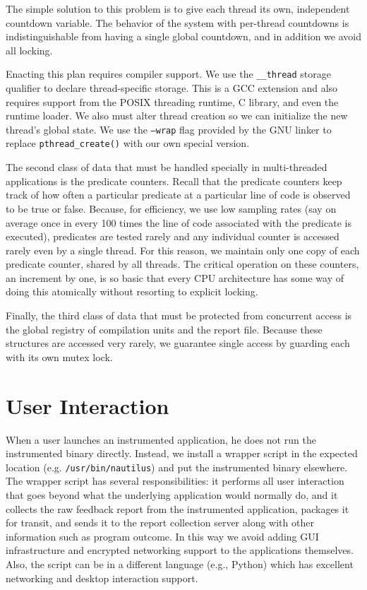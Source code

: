 \documentclass[times,10pt,twocolumn]{article}
\begin{document}
The simple solution to this problem is to give each thread its own,
independent countdown variable.  The behavior of the system with per-thread
countdowns is indistinguishable from having a single global countdown,
and in addition we avoid all locking.

Enacting this plan requires compiler support.  We use the
\texttt{\_\_thread} storage qualifier to declare thread-specific
storage.  This is a GCC extension and also requires support from the
POSIX threading runtime, C library, and even the runtime loader.  
We also must alter thread creation so we can initialize the
new thread's global state.  We use the \texttt{--wrap} flag provided
by the GNU linker to replace \texttt{pthread\_create()} with our own
special version.  

The second class of data that must be handled specially in
multi-threaded applications is the predicate counters.  Recall that
the predicate counters keep track of how often a particular predicate
at a particular line of code is observed to be true or false.
Because, for efficiency, we use low sampling rates (say on average
once in every 100 times the line of code associated with the predicate
is executed), predicates are tested rarely and any individual counter
is accessed rarely even by a single thread.  For this reason, we
maintain only one copy of each predicate counter, shared by all
threads.  The critical operation on these counters, an increment by
one, is so basic that every CPU architecture has some way of doing
this atomically without resorting to explicit locking.

Finally, the third class of data that must be protected from concurrent access
is the global registry of compilation units and the report file.
Because these structures are accessed very rarely, we guarantee single 
access by guarding each with its own mutex lock.


\section{User Interaction}

When a user launches an instrumented application, he does not run the
instrumented binary directly.  Instead, we install a wrapper script in
the expected location (e.g. \texttt{/usr/bin/nautilus}) and put the
instrumented binary elsewhere.  The wrapper script has several
responsibilities:  it performs all user interaction
that goes beyond what the underlying application would normally do, and
it collects the raw feedback report from the instrumented
application, packages it for transit, and sends it to the report
collection server along with other information such as program
outcome.  In this way we avoid adding GUI infrastructure and
encrypted networking support to the applications themselves.
Also, the script can be in a different language (e.g., Python)
which has excellent networking and desktop interaction support.
\end{document}
